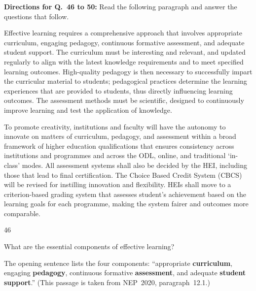 \begin{context}
\textbf{Directions for Q.~46 to 50:} Read the following paragraph and answer the questions that follow.\par\smallskip
Effective learning requires a comprehensive approach that involves appropriate curriculum, engaging pedagogy, continuous formative assessment, and adequate student support. The curriculum must be interesting and relevant, and updated regularly to align with the latest knowledge requirements and to meet specified learning outcomes. High-quality pedagogy is then necessary to successfully impart the curricular material to students; pedagogical practices determine the learning experiences that are provided to students, thus directly influencing learning outcomes. The assessment methods must be scientific, designed to continuously improve learning and test the application of knowledge.

To promote creativity, institutions and faculty will have the autonomy to innovate on matters of curriculum, pedagogy, and assessment within a broad framework of higher education qualifications that ensures consistency across institutions and programmes and across the ODL, online, and traditional `in-class' modes. All assessment systems shall also be decided by the HEI, including those that lead to final certification. The Choice Based Credit System (CBCS) will be revised for instilling innovation and flexibility. HEIs shall move to a criterion-based grading system that assesses student's achievement based on the learning goals for each programme, making the system fairer and outcomes more comparable.
\end{context}
\begin{question}{46}
{What are the essential components of effective learning?\par}
\begin{explain}
The opening sentence lists the four components: ``appropriate \textbf{curriculum}, engaging \textbf{pedagogy}, continuous formative \textbf{assessment}, and adequate \textbf{student support}.''
(This passage is taken from NEP~2020, paragraph~12.1.)
\end{explain}
\end{question}

